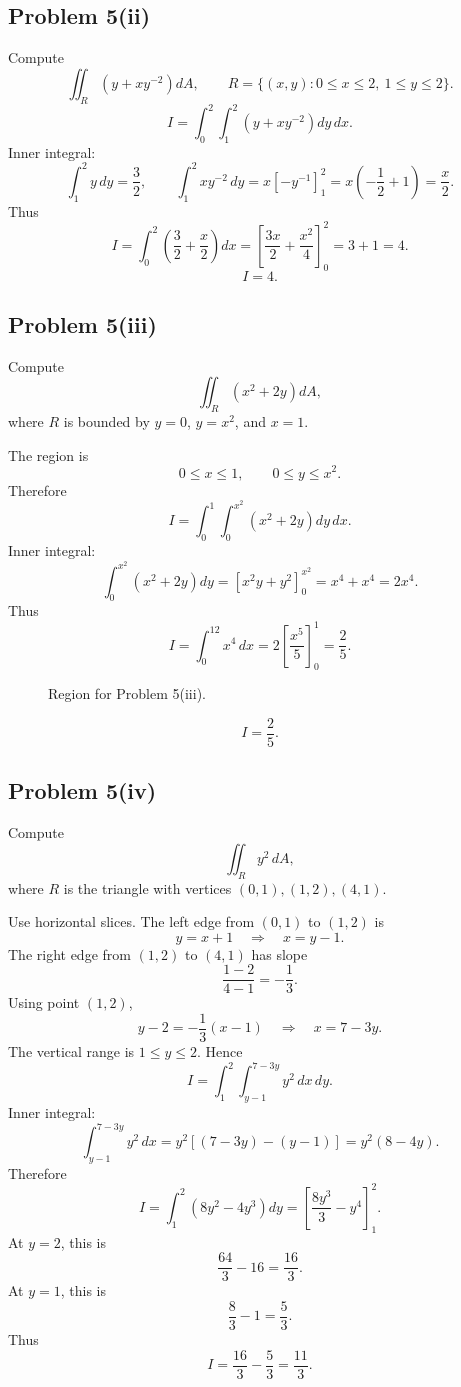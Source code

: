 \documentclass[11pt,a4paper]{article}
\begin{document}
\subsection{Problem 5(ii)}
Compute
\[
 \iint_R\left(y+xy^{-2}\right)dA,
\qquad R=\{(x,y):0\le x\le2,
\ 1\le y\le2\}.
\]
\[
 I=\int_0^2\int_1^2\left(y+xy^{-2}\right)dy\,dx.
\]
Inner integral:
\[
 \int_1^2y\,dy=\frac{3}{2},
\qquad
 \int_1^2xy^{-2}\,dy=x[-y^{-1}]_1^2=x\left(-\frac12+1\right)=\frac{x}{2}.
\]
Thus
\[
 I=\int_0^2\left(\frac32+\frac x2\right)dx
 =\left[\frac{3x}{2}+\frac{x^2}{4}\right]_0^2
 =3+1=4.
\]
\[
\boxed{I=4.}
\]

\subsection{Problem 5(iii)}
Compute
\[
 \iint_R(x^2+2y)dA,
\]
where \(R\) is bounded by \(y=0\), \(y=x^2\), and \(x=1\).

The region is
\[
 0\le x\le1,
\qquad 0\le y\le x^2.
\]
Therefore
\[
 I=\int_0^1\int_0^{x^2}(x^2+2y)dy\,dx.
\]
Inner integral:
\[
 \int_0^{x^2}(x^2+2y)dy
 =\left[x^2y+y^2\right]_0^{x^2}
 =x^4+x^4=2x^4.
\]
Thus
\[
 I=\int_0^12x^4\,dx=2\left[\frac{x^5}{5}\right]_0^1=\frac25.
\]

\begin{figure}[H]
\centering
{}
\caption{Region for Problem 5(iii).}
\end{figure}

\[
\boxed{I=\frac25.}
\]

\subsection{Problem 5(iv)}
Compute
\[
 \iint_R y^2\,dA,
\]
where \(R\) is the triangle with vertices \((0,1),(1,2),(4,1)\).

Use horizontal slices.  The left edge from \((0,1)\) to \((1,2)\) is
\[
 y=x+1
\quad\Longrightarrow\quad
x=y-1.
\]
The right edge from \((1,2)\) to \((4,1)\) has slope
\[
 \frac{1-2}{4-1}=-\frac13.
\]
Using point \((1,2)\),
\[
 y-2=-\frac13(x-1)
\quad\Longrightarrow\quad
x=7-3y.
\]
The vertical range is \(1\le y\le2\).  Hence
\[
 I=\int_1^2\int_{y-1}^{7-3y}y^2\,dx\,dy.
\]
Inner integral:
\[
 \int_{y-1}^{7-3y}y^2\,dx=y^2\left[(7-3y)-(y-1)\right]
 =y^2(8-4y).
\]
Therefore
\[
 I=\int_1^2(8y^2-4y^3)dy
 =\left[\frac{8y^3}{3}-y^4\right]_1^2.
\]
At \(y=2\), this is
\[
 \frac{64}{3}-16=\frac{16}{3}.
\]
At \(y=1\), this is
\[
 \frac{8}{3}-1=\frac{5}{3}.
\]
Thus
\[
 I=\frac{16}{3}-\frac{5}{3}=\frac{11}{3}.
\]
\end{document}
